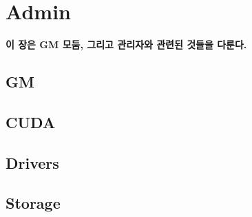 
\graphicspath{{./chap6/images/}}  
\chapter{Admin}
\textbf{이 장은 GM 모둠, 그리고 관리자와 관련된 것들을 다룬다.}

\section{GM}

\section{CUDA}

\section{Drivers}

\section{Storage}
